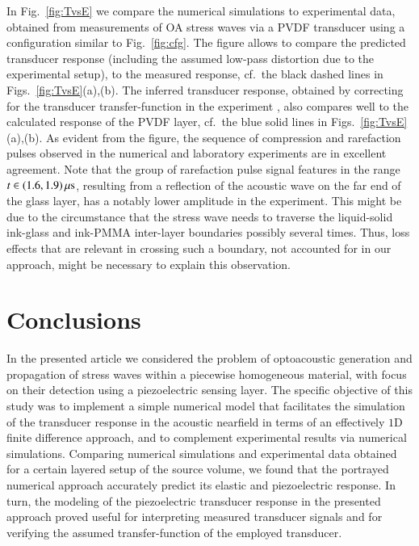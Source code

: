 \documentclass[5p,times,twocolumn]{elsarticle}
\begin{document}
In Fig.\ \ref{fig:TvsE} we compare the numerical simulations to experimental
data, obtained from measurements of OA stress waves via a PVDF transducer 
using a configuration similar to Fig.\ \ref{fig:cfg}. 
The figure allows to compare the predicted transducer response (including the
assumed low-pass distortion due to the experimental setup), to the measured
response, cf.\ the black dashed lines in Figs.\ \ref{fig:TvsE}(a),(b).  The
inferred transducer response, obtained by correcting for the transducer
transfer-function in the experiment \cite{Blumenroether:2017}, also compares
well to the calculated response of the PVDF layer, cf.\ the blue solid lines in
Figs.\ \ref{fig:TvsE}(a),(b).  As evident from the figure, the sequence of
compression and rarefaction pulses observed in the numerical and laboratory
experiments are in excellent agreement. 
Note that the group of rarefaction pulse signal features in the range $t \in
(1.6,1.9)\,{\rm{\mu s}}$, resulting from a reflection of the acoustic wave on
the far end of the glass layer, has a notably lower amplitude in the
experiment. This might be due to the circumstance that the stress wave needs to
traverse the liquid-solid ink-glass and ink-PMMA inter-layer boundaries
possibly several times. Thus, loss effects that are relevant in crossing such a
boundary, not accounted for in our approach, might be necessary to explain
this observation. 

\section{Conclusions}
\label{sec:S5}

In the presented article we considered the problem of optoacoustic generation
and propagation of stress waves within a piecewise homogeneous material, with
focus on their detection using a piezoelectric sensing layer.  The specific
objective of this study was to implement a simple numerical model that
facilitates the simulation of the transducer response in the acoustic nearfield
in terms of an effectively $1$D finite difference approach, and to complement
experimental results via numerical simulations.  Comparing numerical
simulations and experimental data obtained for a certain layered setup of the
source volume, we found that the portrayed numerical approach accurately
predict its elastic and piezoelectric response. In turn, the modeling of the
piezoelectric transducer response in the presented approach proved useful for
interpreting measured transducer signals and for verifying the assumed
transfer-function of the employed transducer.
\end{document}
